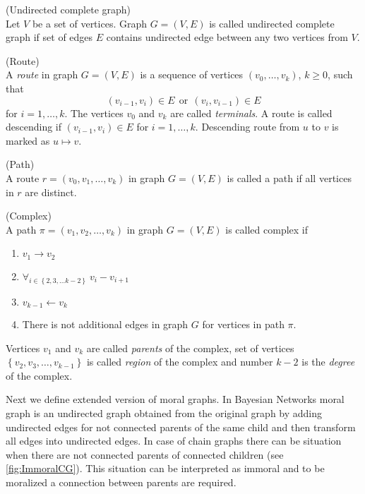 \begin{defi} (Undirected complete graph) \\ 
	Let $V$ be a set of vertices. Graph $G = (V, E)$ is called undirected complete graph if set of edges $E$ 
	contains undirected edge between any two vertices from $V$.
\end{defi}

\begin{defi} (Route) \\
	A \textit{route} in graph $G = (V, E)$ is a sequence of vertices $(v_0, \dots, v_k)$, $k \ge 0$, such that 
	$$ (v_{i-1}, v_i) \in E \ \  \mbox{or} \ \ (v_i, v_{i-1}) \in E$$
	for $i = 1, \dots, k$. The vertices $v_0$ and $v_k$ are called \textit{terminals}. A route is called descending
	if $(v_{i-1}, v_i) \in E$ for $i = 1, \dots, k$. Descending route from $u$ to $v$ is marked as $u \mapsto v$. 
\end{defi}


\begin{defi} (Path) \\
	A route $r = (v_0, v_1, \dots, v_k)$ in graph $G = (V, E)$ is called a path if all vertices in $r$ are distinct.
\end{defi}


\begin{defi} \label{complexDef} (Complex) \\
	A path $\pi = (v_1, v_2, \dots, v_k)$ in graph $G = (V, E)$ is called complex if
	\begin{enumerate}
		\item $v_1 \rightarrow v_2$
		\item $\forall_{i \in \left\{ 2, 3, \dots k-2 \right\}} \ v_i - v_{i+1}$
		\item $v_{k-1} \leftarrow v_k$
		\item There is not additional edges in graph $G$ for vertices in path $\pi$.
	\end{enumerate}
	Vertices $v_1$ and $v_k$ are called \textit{parents} of the complex, set of vertices 
	$\left\{v_2, v_3, \dots, v_{k-1} \right\}$ is called \textit{region} of the complex and number
	$k-2$ is the \textit{degree} of the complex.
\end{defi}
Next we define extended version of moral graphs. In Bayesian Networks moral graph is 
an undirected graph obtained from the original graph by adding undirected edges for not connected parents of the same child and then transform all edges into undirected edges. In case of chain graphs there can be situation when there are 
not connected parents of connected children (see \ref{fig:ImmoralCG}). 
This situation can be interpreted as immoral and to be moralized a connection between parents are required.


